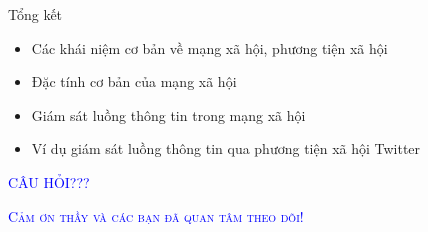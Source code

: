 \documentclass{beamer}
\numberwithin{equation}{section}
\newcommand{\duong}[1]{\textcolor{blue}{#1}}
\begin{document}
\begin{frame}{Tổng kết}
\begin{itemize}
\item Các khái niệm cơ bản về mạng xã hội, phương tiện xã hội
\medskip
\item Đặc tính cơ bản của mạng xã hội
\medskip
\item Giám sát luồng thông tin trong mạng xã hội
\medskip
\item Ví dụ giám sát luồng thông tin qua phương tiện xã hội Twitter
\end{itemize}
\end{frame}

\begin{frame}
\begin{center}
\Huge{\duong{\textsc{CÂU HỎI???}}}
\end{center}
\end{frame}

\begin{frame}
\begin{center}
\Huge{\duong{\textsc{Cảm ơn thầy và các bạn đã quan tâm theo dõi!}}}
\end{center}
\end{frame}
\end{document}
